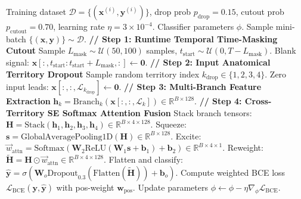 \documentclass[12pt]{elsarticle}
\begin{document}
\begin{algorithm}[t]
\caption{Anatomical Territory-Dropout Classifier Training}
\label{alg:classifier_training}
\begin{algorithmic}[1]
\REQUIRE Training dataset $\mathcal{D} = \{(\mathbf{x}^{(i)}, \mathbf{y}^{(i)})\}$, drop prob $p_{\text{drop}} = 0.15$, cutout prob $p_{\text{cutout}} = 0.70$, learning rate $\eta = 3\times 10^{-4}$.
\ENSURE Classifier parameters $\phi$.
    \STATE Sample mini-batch $\{(\mathbf{x}, \mathbf{y})\} \sim \mathcal{D}$.
    \STATE \textbf{// Step 1: Runtime Temporal Time-Masking Cutout}
        \STATE Sample $L_{\text{mask}} \sim \mathcal{U}(50, 100)$ samples, $t_{\text{start}} \sim \mathcal{U}(0, T - L_{\text{mask}})$.
        \STATE Blank signal: $\mathbf{x}[:, t_{\text{start}} : t_{\text{start}} + L_{\text{mask}}, :] \leftarrow \mathbf{0}$.
    \ENDIF
    \STATE \textbf{// Step 2: Input Anatomical Territory Dropout}
        \STATE Sample random territory index $k_{\text{drop}} \in \{1, 2, 3, 4\}$.
        \STATE Zero input leads: $\mathbf{x}[:, :, \mathcal{L}_{k_{\text{drop}}}] \leftarrow \mathbf{0}$.
    \ENDIF
    \STATE \textbf{// Step 3: Multi-Branch Feature Extraction}
        \STATE $\mathbf{h}_k = \text{Branch}_k(\mathbf{x}[:, :, \mathcal{L}_k]) \in \mathbb{R}^{B \times 128}$.
    \ENDFOR
    \STATE \textbf{// Step 4: Cross-Territory SE Softmax Attention Fusion}
    \STATE Stack branch tensors: $\mathbf{H} = \text{Stack}(\mathbf{h}_1, \mathbf{h}_2, \mathbf{h}_3, \mathbf{h}_4) \in \mathbb{R}^{B \times 4 \times 128}$.
    \STATE Squeeze: $\mathbf{s} = \text{GlobalAveragePooling1D}(\mathbf{H}) \in \mathbb{R}^{B \times 128}$.
    \STATE Excite: $\vec{w}_{\text{attn}} = \text{Softmax}(\mathbf{W}_2 \text{ReLU}(\mathbf{W}_1 \mathbf{s} + \mathbf{b}_1) + \mathbf{b}_2) \in \mathbb{R}^{B \times 4 \times 1}$.
    \STATE Reweight: $\tilde{\mathbf{H}} = \mathbf{H} \odot \vec{w}_{\text{attn}} \in \mathbb{R}^{B \times 4 \times 128}$.
    \STATE Flatten and classify: $\hat{\mathbf{y}} = \sigma\left(\mathbf{W}_o \text{Dropout}_{0.3}(\text{Flatten}(\tilde{\mathbf{H}})) + \mathbf{b}_o\right)$.
    \STATE Compute weighted BCE loss $\mathcal{L}_{\text{BCE}}(\mathbf{y}, \hat{\mathbf{y}})$ with pos-weight $\mathbf{w}_{\text{pos}}$.
    \STATE Update parameters $\phi \leftarrow \phi - \eta \nabla_\phi \mathcal{L}_{\text{BCE}}$.
\ENDWHILE
\end{algorithmic}
\end{algorithm}
\end{document}
